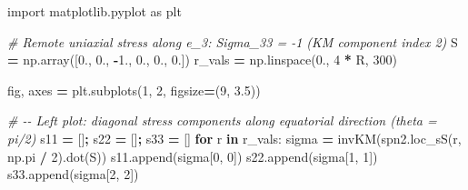 \documentclass[
  a4paper,
  numbers=noendperiod,
  DIV=12]{scrreprt}
\newenvironment{Shaded}{\begin{snugshade}}{\end{snugshade}}
\newcommand{\CommentTok}[1]{\textcolor[rgb]{0.56,0.35,0.01}{\textit{#1}}}
\newcommand{\ControlFlowTok}[1]{\textcolor[rgb]{0.13,0.29,0.53}{\textbf{#1}}}
\newcommand{\DecValTok}[1]{\textcolor[rgb]{0.00,0.00,0.81}{#1}}
\newcommand{\FloatTok}[1]{\textcolor[rgb]{0.00,0.00,0.81}{#1}}
\newcommand{\ImportTok}[1]{#1}
\newcommand{\KeywordTok}[1]{\textcolor[rgb]{0.13,0.29,0.53}{\textbf{#1}}}
\newcommand{\NormalTok}[1]{#1}
\newcommand{\OperatorTok}[1]{\textcolor[rgb]{0.81,0.36,0.00}{\textbf{#1}}}
\begin{document}
\begin{Shaded}
\begin{Highlighting}[]
\ImportTok{import}\NormalTok{ matplotlib.pyplot }\ImportTok{as}\NormalTok{ plt}

\CommentTok{\# Remote uniaxial stress along e\_3: Sigma\_33 = {-}1 (KM component index 2)}
\NormalTok{S }\OperatorTok{=}\NormalTok{ np.array([}\FloatTok{0.}\NormalTok{, }\FloatTok{0.}\NormalTok{, }\OperatorTok{{-}}\FloatTok{1.}\NormalTok{, }\FloatTok{0.}\NormalTok{, }\FloatTok{0.}\NormalTok{, }\FloatTok{0.}\NormalTok{])}
\NormalTok{r\_vals }\OperatorTok{=}\NormalTok{ np.linspace(}\FloatTok{0.}\NormalTok{, }\DecValTok{4} \OperatorTok{*}\NormalTok{ R, }\DecValTok{300}\NormalTok{)}

\NormalTok{fig, axes }\OperatorTok{=}\NormalTok{ plt.subplots(}\DecValTok{1}\NormalTok{, }\DecValTok{2}\NormalTok{, figsize}\OperatorTok{=}\NormalTok{(}\DecValTok{9}\NormalTok{, }\FloatTok{3.5}\NormalTok{))}

\CommentTok{\# {-}{-} Left plot: diagonal stress components along equatorial direction (theta = pi/2)}
\NormalTok{s11 }\OperatorTok{=}\NormalTok{ []}\OperatorTok{;}\NormalTok{ s22 }\OperatorTok{=}\NormalTok{ []}\OperatorTok{;}\NormalTok{ s33 }\OperatorTok{=}\NormalTok{ []}
\ControlFlowTok{for}\NormalTok{ r }\KeywordTok{in}\NormalTok{ r\_vals:}
\NormalTok{    sigma }\OperatorTok{=}\NormalTok{ invKM(spn2.loc\_sS(r, np.pi }\OperatorTok{/} \DecValTok{2}\NormalTok{).dot(S))}
\NormalTok{    s11.append(sigma[}\DecValTok{0}\NormalTok{, }\DecValTok{0}\NormalTok{])}
\NormalTok{    s22.append(sigma[}\DecValTok{1}\NormalTok{, }\DecValTok{1}\NormalTok{])}
\NormalTok{    s33.append(sigma[}\DecValTok{2}\NormalTok{, }\DecValTok{2}\NormalTok{])}


\end{Highlighting}
\end{Shaded}
\end{document}
